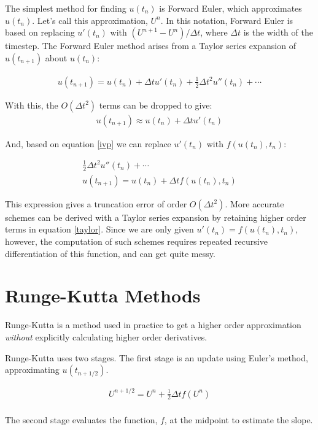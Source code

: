 \documentclass[12pt]{article}
\begin{document}
The simplest method for finding $u(t_n)$ is Forward Euler, which approximates 
$u(t_n)$. Let's call this approximation, $U^n$. In this notation, Forward Euler 
is based on replacing $u'(t_n)$ with $(U^{n+1} - U^n)/\Delta t$, where $\Delta t$ is the width of the timestep.
The Forward Euler method arises from a Taylor series expansion of $u(t_{n+1})$ 
about $u(t_n)$:

\begin{align}
u(t_{n+1}) = u(t_n) + \Delta tu'(t_n) + \frac{1}{2}\Delta t^2u''(t_n) + \cdots
\label{taylor}
\end{align}

With this, the $O(\Delta t^2)$ terms can be dropped to give:
\begin{align}
u(t_{n+1}) \approx u(t_n) + \Delta tu'(t_n) 
\end{align}

And, based on equation \eqref{ivp} we can replace $u'(t_n)$ with 
$f(u(t_n),t_n)$:

\begin{align}
\frac{1}{2}\Delta t^2u''(t_n) + \cdots\\
u(t_{n+1}) = u(t_n) + \Delta tf(u(t_n),t_n)
\end{align}

This expression gives a truncation error of order $O(\Delta t^2)$. More 
accurate schemes can be derived with a Taylor series expansion by retaining 
higher order terms in equation \eqref{taylor}. Since we are only given 
$u'(t_n) = f(u(t_n),t_n)$, however, the computation of such schemes requires 
repeated recursive differentiation of this function, and can get quite messy.


\section{Runge-Kutta Methods}

Runge-Kutta is a method used in practice to get a higher order approximation 
\emph{without} explicitly calculating higher order derivatives.

Runge-Kutta uses two stages. The first stage is an update using Euler's method, 
approximating $u(t_{n+1/2})$. 

\begin{align}
U^{n+1/2} = U^n + \frac{1}{2}\Delta tf(U^n)\\
\end{align}

The second stage evaluates the function, $f$, at the midpoint to estimate the 
slope.
\end{document}
